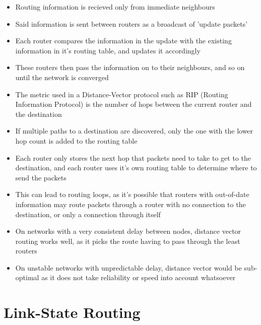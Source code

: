 \begin{itemize}
  \item Routing information is recieved only from immediate neighbours
  \item Said information is sent between routers as a broadcast of 'update packets'
  \item Each router compares the information in the update with the existing information in it's routing table, and updates it accordingly
  \item These routers then pass the information on to their neighbours, and so on until the network is converged
  \item The metric used in a Distance-Vector protocol such as RIP (Routing Information Protocol) is the number of hops between the current router and the destination
  \item If multiple paths to a destination are discovered, only the one with the lower hop count is added to the routing table
  \item Each router only stores the next hop that packets need to take to get to the destination, and each router uses it's own routing table to determine where to send the packets
  \item This can lead to routing loops, as it's possible that routers with out-of-date information may route packets through a router with no connection to the destination, or only a connection through itself
  \item On networks with a very consistent delay between nodes, distance vector routing works well, as it picks the route having to pass through the least routers
  \item On unstable networks with unpredictable delay, distance vector would be sub-optimal as it does not take reliability or speed into account whatsoever
\end{itemize}

\section*{Link-State Routing}


